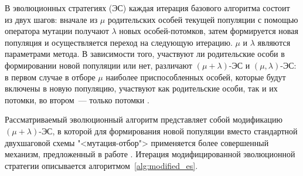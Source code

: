 \documentclass[12pt]{article}
\begin{document}
В эволюционных стратегиях (ЭС) каждая итерация базового алгоритма состоит из 
двух шагов: вначале из $\mu$ родительских особей текущей популяции с помощью 
оператора мутации получают $\lambda$ новых особей-потомков, затем формируется 
новая популяция и осуществляется переход на следующую итерацию. $\mu$ и 
$\lambda$ являются параметрами метода. В зависимости того, участвуют ли 
родительские особи в формировании новой популяции или нет, различают 
$(\mu + \lambda)$-ЭС и $(\mu, \lambda)$-ЭС: в первом случае в отборе $\mu$ 
наиболее приспособленных особей, которые будут включены в новую популяцию, 
участвуют как родительские особи, так и их потомки, во втором~--- только 
потомки 
\cite{schwefel95}. 

Рассматриваемый эволюционный алгоритм представляет собой модификацию 
$(\mu + \lambda)$-ЭС, в которой для формирования новой популяции вместо 
стандартной двухшаговой схемы "<мутация-отбор"> применяется более совершенный 
механизм, предложенный в работе 
\cite[с.~62]{michalewicz98}.
Итерация модифицированной эволюционной стратегии описывается 
алгоритмом~\ref{alg:modified_es}.
\end{document}
